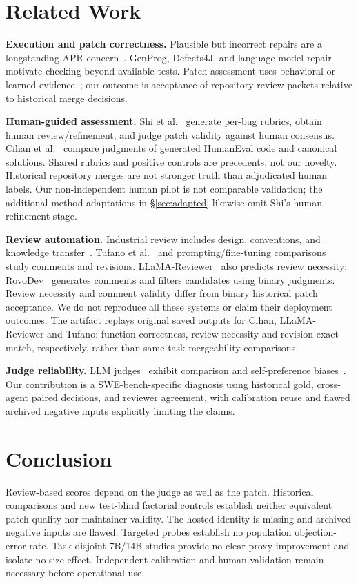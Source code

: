 \documentclass[10pt,conference]{IEEEtran}
\begin{document}
\section{Related Work}
\textbf{Execution and patch correctness.} Plausible but incorrect repairs are a longstanding
APR concern~\cite{overfitting,qirandom}. GenProg, Defects4J, and language-model
repair~\cite{legoues2012genprog,just2014defects4j,xia2022alpharepair,jiang2023impact}
motivate checking beyond available tests. Patch assessment uses behavioral or learned
evidence~\cite{patchcorrectness,patchsim}; our outcome is acceptance of repository review
packets relative to historical merge decisions.

\textbf{Human-guided assessment.} Shi et al.~\cite{hitlpatch} generate per-bug rubrics,
obtain human review/refinement, and judge patch validity against human consensus.
Cihan et al.~\cite{cihanreview} compare judgments of generated HumanEval code and
canonical solutions. Shared rubrics and positive controls are precedents, not our novelty.
Historical repository merges are not stronger truth than adjudicated human labels.
Our non-independent human pilot is not comparable validation; the additional method
adaptations in \S\ref{sec:adapted} likewise omit Shi's human-refinement stage.

\textbf{Review automation.} Industrial review includes design, conventions, and knowledge
transfer~\cite{modernreview,bacchelli2013review,rigby2013convergent}.
Tufano et al.~\cite{tufanoreview} and prompting/fine-tuning
comparisons~\cite{promptreview} study comments and revisions. LLaMA-Reviewer~\cite{llamareviewer}
also predicts review necessity; RovoDev~\cite{rovodev} generates comments and filters
candidates using binary judgments. Review necessity and comment validity differ from
binary historical patch acceptance. We do not reproduce all these systems or claim
their deployment outcomes. The artifact replays original saved outputs for Cihan,
LLaMA-Reviewer and Tufano: function correctness, review necessity and revision exact
match, respectively, rather than same-task mergeability comparisons.

\textbf{Judge reliability.} LLM judges~\cite{llmjudge} exhibit comparison and self-preference
biases~\cite{wang2024fair,panickssery2024selfpref}. Our contribution is a SWE-bench-specific
diagnosis using historical gold, cross-agent paired decisions, and reviewer agreement,
with calibration reuse and flawed archived negative inputs explicitly limiting the claims.

\section{Conclusion}
Review-based scores depend on the judge as well as the patch. Historical comparisons
and new test-blind factorial controls establish neither equivalent patch quality nor
maintainer validity. The hosted identity is missing and archived negative inputs are
flawed. Targeted probes establish no population objection-error rate. Task-disjoint
7B/14B studies provide no clear proxy improvement and isolate no size effect.
Independent calibration and human validation remain necessary before operational use.
\end{document}
